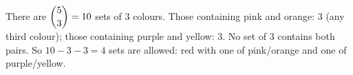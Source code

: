 There are $\dbinom53=10$ sets of $3$ colours. Those containing pink and orange: $3$ (any third colour); those containing purple and yellow: $3$. No set of $3$ contains both pairs. So $10-3-3=\boxed{4}$ sets are allowed: red with one of pink/orange and one of purple/yellow.
